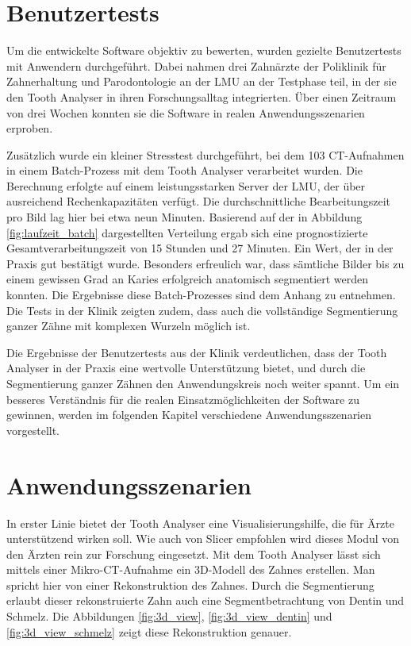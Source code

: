 \section{Benutzertests}
\label{sec:benutzertests}Um die entwickelte Software objektiv zu bewerten, wurden
gezielte Benutzertests mit Anwendern durchgeführt. Dabei nahmen drei Zahnärzte
der Poliklinik für Zahnerhaltung und Parodontologie an der LMU an der Testphase
teil, in der sie den Tooth Analyser in ihren Forschungsalltag integrierten. Über
einen Zeitraum von drei Wochen konnten sie die Software in realen
Anwendungsszenarien erproben.

Zusätzlich wurde ein kleiner Stresstest durchgeführt, bei dem 103 \ac{CT}-Aufnahmen in
einem Batch-Prozess mit dem Tooth Analyser verarbeitet wurden. Die Berechnung
erfolgte auf einem leistungsstarken Server der LMU, der über ausreichend Rechenkapazitäten
verfügt. Die durchschnittliche Bearbeitungszeit pro Bild lag hier bei etwa neun
Minuten. Basierend auf der in Abbildung \ref{fig:laufzeit_batch} dargestellten Verteilung
ergab sich eine prognostizierte Gesamtverarbeitungszeit von 15 Stunden und 27 Minuten.
Ein Wert, der in der Praxis gut bestätigt wurde. Besonders erfreulich war, dass sämtliche
Bilder bis zu einem gewissen Grad an Karies erfolgreich anatomisch segmentiert werden
konnten. Die Ergebnisse diese Batch-Prozesses sind dem Anhang zu entnehmen.
Die Tests in der Klinik zeigten zudem, dass auch die vollständige Segmentierung
ganzer Zähne mit komplexen Wurzeln möglich ist.

Die Ergebnisse der Benutzertests aus der Klinik verdeutlichen, dass der Tooth
Analyser in der Praxis eine wertvolle Unterstützung bietet, und durch die Segmentierung
ganzer Zähnen den Anwendungskreis noch weiter spannt. Um ein besseres
Verständnis für die realen Einsatzmöglichkeiten der Software zu gewinnen, werden
im folgenden Kapitel verschiedene Anwendungsszenarien vorgestellt.

\section{Anwendungsszenarien}
In erster Linie bietet der Tooth Analyser eine Visualisierungshilfe, die für
Ärzte unterstützend wirken soll. Wie auch von Slicer empfohlen wird dieses Modul
von den Ärzten rein zur Forschung eingesetzt. Mit dem Tooth Analyser lässt sich
mittels einer Mikro-\ac{CT}-Aufnahme ein \ac{3D}-Modell des Zahnes erstellen. Man
spricht hier von einer Rekonstruktion des Zahnes. Durch die Segmentierung erlaubt
dieser rekonstruierte Zahn auch eine Segmentbetrachtung von Dentin und Schmelz.
Die Abbildungen \ref{fig:3d_view}, \ref{fig:3d_view_dentin} und \ref{fig:3d_view_schmelz}
zeigt diese Rekonstruktion genauer.

